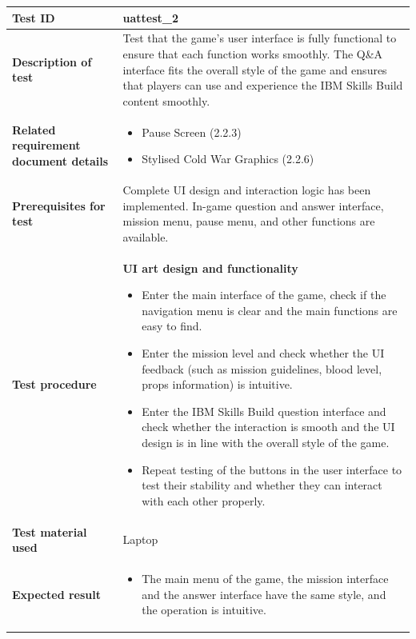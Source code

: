 \documentclass[11pt, a4paper]{article}
\begin{document}
\begin{center}
\begin{tabularx}{\linewidth}{|>{\raggedright\arraybackslash}m{4cm}|X|}
    \hline
    \textbf{Test ID} & uattest\_2 \\
    \hline
    \textbf{Description of test} & Test that the game's user interface is fully functional to ensure that each function works smoothly. The Q\&A interface fits the overall style of the game and ensures that players can use and experience the IBM Skills Build content smoothly. \\
    \hline
    \textbf{Related requirement document details} &
        \begin{itemize}\setlength{\itemsep}{2pt}
            \item Pause Screen (2.2.3)
            \item Stylised Cold War Graphics (2.2.6)
        \end{itemize}
    \\
    \hline
    \textbf{Prerequisites for test} & Complete UI design and interaction logic has been implemented. In-game question and answer interface, mission menu, pause menu, and other functions are available. \\
    \hline
    \textbf{Test procedure} &
    \textbf{UI art design and functionality}
        \begin{itemize}\setlength{\itemsep}{2pt}
            \item Enter the main interface of the game, check if the navigation menu is clear and the main functions are easy to find.
            \item Enter the mission level and check whether the UI feedback (such as mission guidelines, blood level, props information) is intuitive.
            \item Enter the IBM Skills Build question interface and check whether the interaction is smooth and the UI design is in line with the overall style of the game.
            \item Repeat testing of the buttons in the user interface to test their stability and whether they can interact with each other properly.
        \end{itemize}
    \\
    \hline
    \textbf{Test material used} & Laptop \\
    \hline
    \textbf{Expected result} &
        \begin{itemize}\setlength{\itemsep}{2pt}
            \item The main menu of the game, the mission interface and the answer interface have the same style, and the operation is intuitive.

\end{itemize}
\end{tabularx}
\end{center}
\end{document}
